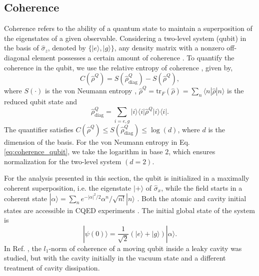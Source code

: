\documentclass[aps,pre,superscriptaddress,twocolumn,10pt]{revtex4-2}
\begin{document}
\subsection{Coherence}
\label{subsec: coherence}
Coherence refers to the ability of a quantum state to maintain a superposition of the eigenstates of a given observable. 
Considering a two-level system (qubit) in the basis of $\hat{\sigma}_z$, denoted by $\{|e\rangle,|g\rangle\}$, any density matrix with a nonzero off-diagonal element possesses a certain amount of coherence \cite{Messinger2019,Streltsov2017}.
To quantify the coherence in the qubit, we use the relative entropy of coherence \cite{Baumgratz2014}, given by,
\begin{equation}
    C(\hat{\rho}^{Q}) = S(\hat{\rho}^{Q}_{\text{diag}}) - S(\hat{\rho}^{Q}),
    \label{eq:coherence_qubit}
\end{equation}
where $S(\cdot)$ is the von Neumann entropy \cite{VonNeumann1927b,Nielsen2010}, $\hat{\rho}^{Q}=\text{tr}_F(\hat{\rho})=\sum_n \langle n|\hat{\rho}|n\rangle$ is the reduced qubit state and 
\begin{equation}
    \hat{\rho}^{Q}_{\text{diag}}=\sum_{i=e,g}|i\rangle \langle i|\hat{\rho}^{Q}|i\rangle \langle i|.
\end{equation} 
The quantifier satisfies $C(\hat{\rho}^{Q}) \leq S(\hat{\rho}^{Q}_{\text{diag}}) \leq \log(d)$,
where $d$ is the dimension of the basis.
For the von Neumann entropy in Eq. \eqref{eq:coherence_qubit}, we take the logarithm in base $2$, which ensures normalization for the two-level system $(d=2)$.

For the analysis presented in this section, the qubit is initialized in a maximally coherent superposition, i.e. the eigenstate $|+\rangle$ of $\hat{\sigma}_x$,
while the field starts in a coherent state $|\alpha\rangle = \sum_{n} e^{-|\alpha|^2/2} \alpha^n/\sqrt{n!} |n\rangle$ \cite{Glauber1963c,GERRY2005}.
Both the atomic and cavity initial states are accessible in CQED experiments \cite{Brune1996,Marrocco2005,Haroche2013}. 
The initial global state of the system is
\begin{equation} \label{eq:superposition}
|\psi(0)\rangle = \frac{1}{\sqrt{2}} \left( |e\rangle + |g\rangle \right) |\alpha\rangle.
\end{equation}
In Ref. \cite{Mortezapour2017b}, the $l_1$-norm of coherence of a moving qubit inside a leaky cavity was studied, but with the cavity initially in the vacuum state and a different treatment of cavity dissipation.
\end{document}
